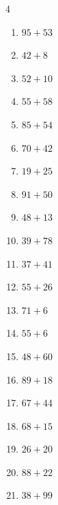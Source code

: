 \begin{multicols}{4}
\begin{enumerate}
  \item $95+53$
        \phantom{$=148$}

  \item $42+8$
        \phantom{$=50$}

  \item $52+10$
        \phantom{$=62$}

\columnbreak %

  \item $55+58$
        \phantom{$=113$}

  \item $85+54$
        \phantom{$=139$}

  \item $70+42$
        \phantom{$=112$}

  \item $19+25$
        \phantom{$=44$}

  \item $91+50$
        \phantom{$=141$}

  \item $48+13$
        \phantom{$=61$}

  \item $39+78$
        \phantom{$=117$}

  \item $37+41$
        \phantom{$=78$}

  \item $55+26$
        \phantom{$=81$}

  \item $71+6$
        \phantom{$=77$}

  \item $55+6$
        \phantom{$=61$}

  \item $48+60$
        \phantom{$=108$}

  \item $89+18$
        \phantom{$=107$}

  \item $67+44$
        \phantom{$=111$}

  \item $68+15$
        \phantom{$=83$}

  \item $26+20$
        \phantom{$=46$}

  \item $88+22$
        \phantom{$=110$}

  \item $38+99$
        \phantom{$=137$}


\end{enumerate}
\end{multicols}
